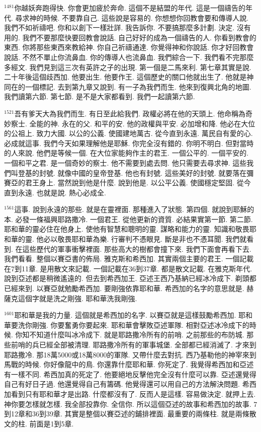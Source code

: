 \documentclass{book}
\begin{document}
$^{1481}$你越妖奔跑得快.
你會更加疲於奔命.
這個不是結盟的年代.
這是一個禱告的年代.
尋求神的時候.
不要靠自己.
這些說是容易的.
你想想你回教會要和傳導人說.
我們不如祈禱吧.
你和以創下一樣壯詳.
我告訴你.
不要搞那麼多計劃.
決定.
沒有用的.
我們不要那麼快要回教會說話.
自己好好的成為一個禱告的人.
你看到教會的東西.
你將那些東西來教給神.
你自己祈禱通達.
你覺得神和你說話.
你才好回教會說話.
不然不單止你流鼻血.
你的傳導人也流鼻血.
我們綜合一下.
我們看不完那麼多經文.
我們見到這三次有英許之子的出現.
第一個是二馬來利.
第七章其實是說.
二十年後這個歧西加.
他要出生.
他要作王.
這個歷史的關口他就出生了.
他就是神同在的一個標記.
去到第九章又說到.
有一子為我們而生.
他來到復興北角的地圖.
我們讀第六節.
第七節.
是不是大家都看到.
我們一起讀第六節.

$^{1521}$吾有爹天大為我們而生.
有日至此給我們.
政權必將在他的天頭上.
他命稱為奇妙察士.
全能的神.
永在的父.
和平的安.
他的政權與平安.
必加增和降.
他必在大位的公祖上.
致力大國.
以公的公義.
使國建地萬古.
從今直到永遠.
萬民自有愛的心.
必成就這事.
我們今天如果理解他是耶穌.
你完全沒有錯的.
你明不明白.
但對當時的人來說.
他們是等候一個.
在大位家能夠作主的君王.
一個公平的.
一個平安的.
一個和平之君.
是一個奇妙的察士.
他不需要到處去問.
他只需要去尋求神.
這些我們叫登基的封號.
就像中國的皇帝登基.
他也有封號.
這些美好的封號.
就要落在彌賽亞的君王身上.
當然說到他是什麼.
說到他是.
以公平公義.
使國穩定堅固.
從今直到永遠.
也就是說.
熱心必成全.

$^{1561}$這事.
說到永遠的那些.
就是在靈裡面.
那種進入了狀態.
第四個.
就說到耶穌的本.
必發一條福興耶路撒冷.
一個君王.
從他更新的資質.
必結果實第一節.
第二節.
耶和華的靈必住在他身上.
使他有智慧和聰明的靈.
謀略和能力的靈.
知識和敬畏耶和華的靈.
他必以敬畏耶和華為樂.
行審判不憑眼見.
斷是非也不憑耳聞.
我們就看到.
在這些歷代的軍事衝擊裡面.
那些高大的樹都會撞下來.
我們下面會再看下去.
我們看看.
整個以賽亞書的佈局.
雅克斯和希西加.
其實兩個主要的君王.
一個記載在7到11章.
是用散文來記載.
一個記載在36到37章.
都是散文記載.
在雅克斯年代.
說到亞述都是稍微遙遠的.
但去到希西加王.
亞述王西乃基納已經冰冷成下.
剃頭都已經來到.
以賽亞就勉勵希西加.
要剛強依靠耶和華.
希西加的名字的意思就是.
赫薩克這個字就是洗之剛強.
耶和華洗我剛強.

$^{1601}$耶和華是我的力量.
這個就是希西加的名字.
以賽亞就是這樣鼓勵希西加.
耶和華要洗你剛強.
你要奮勇你要起來.
耶和華會擊敗亞述軍隊.
相對亞述冰冷成下的時候.
你知不知道什麼叫冰冷成下.
就是耶路撒冷所有的前哨.
之前那些的布防城.
那些前哨的兵已經全部被清理.
耶路撒冷所有的軍事城堡.
全部都已經消滅了.
才來到耶路撒冷.
那18萬5000或18萬8000的軍隊.
又帶什麼去對抗.
西乃基勒他的神宰來到馬戰的時候.
你好像龍中的鳥.
你還靠什麼耶和華.
你死定了.
我覺得希西加和亞述有一樣不同.
希西加真的死定了.
他要絕地反擊他完全沒有什麼可以靠.
亞述還覺得自己有好日子過.
他還覺得自己有籌碼.
他覺得還可以用自己的方法解決問題.
希西加看到只有耶和華才是出路.
什麼都沒有了.
反而人是這樣.
容易做決定.
就押上去.
神你要怎樣就怎樣.
我全部投靠你.
全信你.
所以這個亞述的故事和希西加的故事.
7到12章和36到39章.
其實是整個以賽亞述的鋪排裡面.
最重要的兩條柱.
就是兩條散文的柱.
前面是1到5章.
\end{document}
